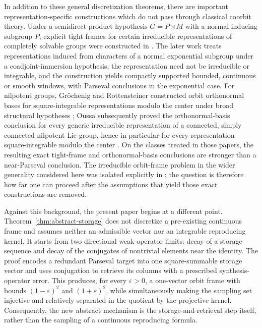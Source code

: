 \documentclass[10pt,a4paper]{amsart}
\numberwithin{equation}{section}
\begin{document}
In addition to these general discretization theorems, there are important
representation-specific constructions which do not pass through classical
coorbit theory.  Under a semidirect-product hypothesis
$G=P\rtimes M$ with a normal inducing subgroup $P$, explicit tight frames for
certain irreducible representations of completely solvable groups were
constructed in \cite{Oussa2018}.  The later work \cite{Oussa2019} treats
representations induced from characters of a normal exponential subgroup
under a coadjoint-immersion hypothesis; the representation need not be
irreducible or integrable, and the construction yields compactly supported
bounded, continuous or smooth windows, with Parseval conclusions in the
exponential case.  For nilpotent groups, Gr\"ochenig and Rottensteiner
constructed orbit orthonormal bases for square-integrable representations
modulo the center under broad structural hypotheses
\cite{GrochenigRottensteiner2018}; Oussa subsequently proved the
orthonormal-basis conclusion for every generic irreducible representation of
a connected, simply connected nilpotent Lie group, hence in particular for
every representation square-integrable modulo the center \cite{Oussa2024}.
On the classes treated in those papers, the resulting exact tight-frame and
orthonormal-basis conclusions are stronger than a near-Parseval conclusion.
The irreducible orbit-frame problem in the wider generality considered here
was isolated explicitly in \cite{Oussa2026}; the question is therefore how
far one can proceed after the assumptions that yield those exact
constructions are removed.

Against this background, the present paper begins at a different point.
Theorem~\ref{thm:abstract-storage} does not discretize a pre-existing
continuous frame and assumes neither an admissible vector nor an integrable
reproducing kernel.  It starts from two directional weak-operator limits:
decay of a storage sequence and decay of the conjugates of nontrivial elements
near the identity.  The proof encodes a redundant Parseval target into one
square-summable storage vector and uses conjugation to retrieve its columns
with a prescribed synthesis-operator error.  This produces, for every
$\varepsilon>0$, a one-vector orbit frame with bounds
$(1-\varepsilon)^2$ and $(1+\varepsilon)^2$, while simultaneously making the
sampling set injective and relatively separated in the quotient by the
projective kernel.  Consequently, the new abstract mechanism is the
storage-and-retrieval step itself, rather than the sampling of a continuous
reproducing formula.
\end{document}
